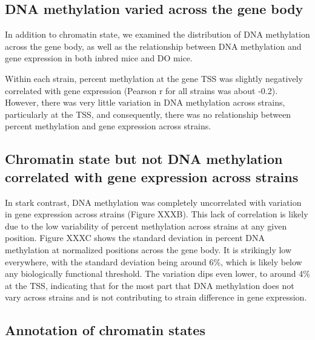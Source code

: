 \documentclass[10pt,letterpaper]{article}
\begin{document}
\hypertarget{dna-methylation-varied-across-the-gene-body}{%
\subsection{DNA methylation varied across the gene
body}\label{dna-methylation-varied-across-the-gene-body}}

In addition to chromatin state, we examined the distribution of DNA
methylation across the gene body, as well as the relationship between
DNA methylation and gene expression in both inbred mice and DO mice.

Within each strain, percent methylation at the gene TSS was slightly
negatively correlated with gene expression (Pearson r for all strains
was about -0.2). However, there was very little variation in DNA
methylation across strains, particularly at the TSS, and consequently,
there was no relationship between percent methylation and gene
expression across strains.

\hypertarget{chromatin-state-but-not-dna-methylation-correlated-with-gene-expression-across-strains}{%
\subsection{Chromatin state but not DNA methylation correlated with gene
expression across
strains}\label{chromatin-state-but-not-dna-methylation-correlated-with-gene-expression-across-strains}}

In stark contrast, DNA methylation was completely uncorrelated with
variation in gene expression across strains (Figure XXXB). This lack of
correlation is likely due to the low variability of percent methylation
across strains at any given position. Figure XXXC shows the standard
deviation in percent DNA methylation at normalized positions across the
gene body. It is strikingly low everywhere, with the standard deviation
being around 6\%, which is likely below any biologically functional
threshold. The variation dips even lower, to around 4\% at the TSS,
indicating that for the most part that DNA methylation does not vary
across strains and is not contributing to strain difference in gene
expression.

\hypertarget{annotation-of-chromatin-states}{%
\subsection{Annotation of chromatin
states}\label{annotation-of-chromatin-states}}
\end{document}

